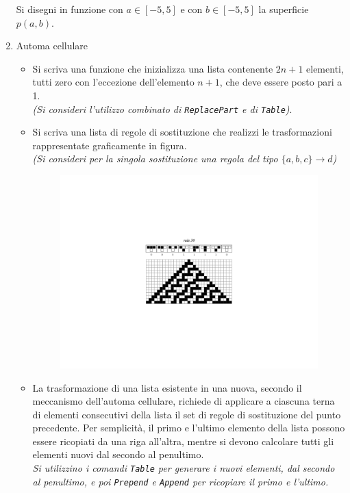\documentclass[12pt]{article}
\begin{document}
\begin{enumerate}
  Si disegni in funzione con $a\in [-5,5]$ e con $b\in[-5,5]$
  la superficie $p(a,b)$.
  
\item
Automa cellulare\\[-0.4cm]
\begin{itemize}
\item
Si scriva una funzione che inizializza una lista contenente $2n+1$ elementi, tutti zero con l'eccezione dell'elemento $n+1$, che deve essere posto pari a 1.\\
{\it (Si consideri l'utilizzo combinato di {\tt ReplacePart} e di {\tt Table})}.


\item
Si scriva una lista di regole di sostituzione che realizzi le trasformazioni rappresentate graficamente in figura.\\
{\it (Si consideri per la singola sostituzione una regola del tipo $\{a,b,c\}\to d$)}
\begin{figure}[!h]
\begin{center}
\includegraphics[width=150mm,angle=0]{regola_base.pdf}
\end{center}
\end{figure}

\item
La trasformazione di una lista esistente in una nuova, secondo il meccanismo dell'automa cellulare, richiede di applicare 
a ciascuna terna di elementi consecutivi della lista il set di regole di sostituzione del punto precedente.
Per semplicit\`a, il primo e l'ultimo elemento della lista possono essere ricopiati da una riga all'altra, mentre si devono calcolare tutti gli elementi nuovi dal secondo al penultimo.\\
{\it Si utilizzino i comandi {\tt Table} per generare i nuovi elementi, dal secondo al penultimo, e poi {\tt Prepend} e {\tt Append} per ricopiare il primo e l'ultimo.}

\end{itemize}


\end{enumerate}
\end{document}

